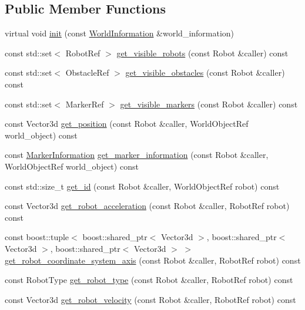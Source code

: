 \subsection*{Public Member Functions}
\begin{CompactItemize}
\item 
virtual void \hyperlink{class_view_fa489c0530d45e3e24c3151c0908240d}{init} (const \hyperlink{class_world_information}{WorldInformation} \&world\_\-information)
\item 
const std::set$<$ RobotRef $>$ \hyperlink{class_view_10dfd4b4f63f779ca9818317b94aa00b}{get\_\-visible\_\-robots} (const Robot \&caller) const 
\item 
const std::set$<$ ObstacleRef $>$ \hyperlink{class_view_cfc09c1945cd9db211dbd3d202c4393c}{get\_\-visible\_\-obstacles} (const Robot \&caller) const 
\item 
const std::set$<$ MarkerRef $>$ \hyperlink{class_view_6365a5abc73adc91784846713e2d24c6}{get\_\-visible\_\-markers} (const Robot \&caller) const 
\item 
const Vector3d \hyperlink{class_view_58fde47c2b683d13f4d038d3e9b37093}{get\_\-position} (const Robot \&caller, WorldObjectRef world\_\-object) const 
\item 
const \hyperlink{class_marker_information}{MarkerInformation} \hyperlink{class_view_7b23348169617597ddb74988fb3ce3e1}{get\_\-marker\_\-information} (const Robot \&caller, WorldObjectRef world\_\-object) const 
\item 
const std::size\_\-t \hyperlink{class_view_865976d08746c6414ae0068904cf8f9c}{get\_\-id} (const Robot \&caller, WorldObjectRef robot) const 
\item 
const Vector3d \hyperlink{class_view_e1900efc7a61a79882222b9efbcc3708}{get\_\-robot\_\-acceleration} (const Robot \&caller, RobotRef robot) const 
\item 
const boost::tuple$<$ boost::shared\_\-ptr$<$ Vector3d $>$, boost::shared\_\-ptr$<$ Vector3d $>$, boost::shared\_\-ptr$<$ Vector3d $>$ $>$ \hyperlink{class_view_d09f4f177a41f7ea019a08a6dcde3009}{get\_\-robot\_\-coordinate\_\-system\_\-axis} (const Robot \&caller, RobotRef robot) const 
\item 
const RobotType \hyperlink{class_view_ce82208b7d2bf96fbc80d6181c8702cc}{get\_\-robot\_\-type} (const Robot \&caller, RobotRef robot) const 
\item 
const Vector3d \hyperlink{class_view_8fb901f861b3caa776cdd40a8937b929}{get\_\-robot\_\-velocity} (const Robot \&caller, RobotRef robot) const 
\item 

\end{CompactItemize}
